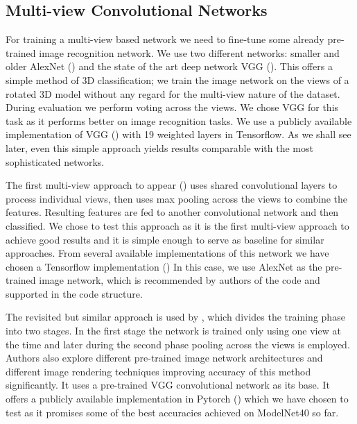 \subsection{Multi-view Convolutional Networks}
For training a multi-view based network we need to fine-tune some already pre-trained image recognition network. We use two different networks: smaller and older AlexNet (\cite{krizhevsky_imagenet_2012}) and the state of the art deep network VGG (\cite{simonyan_very_2014}). This offers a simple method of 3D classification; we train the image network on the views of a rotated 3D model without any regard for the multi-view nature of the dataset. During evaluation we perform voting across the views. We chose VGG for this task as it performs better on image recognition tasks. We use a publicly available implementation of VGG (\cite{machrisaa_vgg_2017}) with 19 weighted layers in Tensorflow. As we shall see later, even this simple approach yields results comparable with the most sophisticated networks.
\par
The first multi-view approach to appear (\cite{su_multi-view_2015}) uses shared convolutional layers to process individual views, then uses max pooling across the views to combine the features. Resulting features are fed to another convolutional network and then classified. We chose to test this approach as it is the first multi-view approach to achieve good results and it is simple enough to serve as baseline for similar approaches. From several available implementations of this network we have chosen a Tensorflow implementation (\cite{lee_multi-view_2016}) In this case, we use AlexNet as the pre-trained image network, which is recommended by authors of the code and supported in the code structure. 
\par
The revisited but similar approach is used by \cite{su_deeper_2018}, which divides the training phase into two stages. In the first stage the network is trained only using one view at the time and later during the second phase pooling across the views is employed. Authors also explore different pre-trained image network architectures and different image rendering techniques improving accuracy of this method significantly. It uses a pre-trained VGG convolutional network as its base. It offers a publicly available implementation in Pytorch (\cite{su_multi-view_2018}) which we have chosen to test as it promises some of the best accuracies achieved on ModelNet40 so far.



